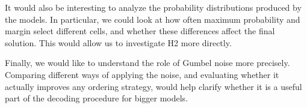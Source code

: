 \documentclass{article}
\begin{document}
It would also be interesting to analyze the probability
distributions produced by the models. In particular,
we could look at how often maximum probability and
margin select different cells, and whether these
differences affect the final solution. This would
allow us to investigate H2 more directly.

Finally, we would like to understand the role of Gumbel
noise more precisely. Comparing different ways of applying
the noise, and evaluating whether it actually improves
any ordering strategy, would help clarify whether it
is a useful part of the decoding procedure for bigger models.









\end{document}
